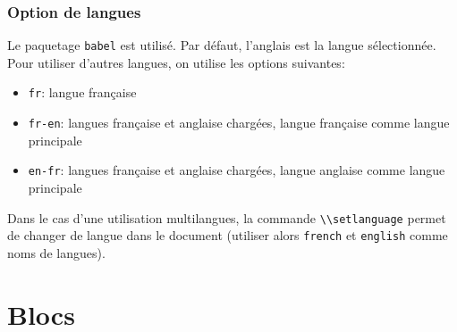 \documentclass[fr,biblatex]{isae-slides}
\begin{document}
\begin{frame}
\frametitle{Option de langues}

\vfill

Le paquetage \lstinline!babel! est utilisé. Par défaut, l'anglais est
la langue sélectionnée. Pour utiliser d'autres langues, on utilise les
options suivantes:

\begin{itemize}
\item \lstinline!fr!: langue française
\item \lstinline!fr-en!: langues française et anglaise chargées,
  langue française comme langue principale
\item \lstinline!en-fr!: langues française et anglaise chargées,
  langue anglaise comme langue principale
\end{itemize}

\vfill

Dans le cas d'une utilisation multilangues, la commande
\lstinline!\\setlanguage! permet de changer de langue dans le document
(utiliser alors \lstinline!french! et \lstinline!english! comme noms
de langues).

\vfill

\end{frame}

\section{Blocs}
\label{sec:blocs}
\end{document}
